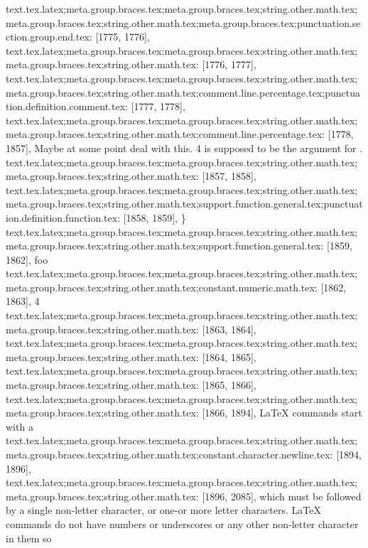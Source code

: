 {{{{{{{{{{{{{{{{{{{{{{{{{{{{{{{{{{{{{{{{{{{{{{{{{text.tex.latex;meta.group.braces.tex;meta.group.braces.tex;string.other.math.tex;meta.group.braces.tex;string.other.math.tex;meta.group.braces.tex;punctuation.section.group.end.tex: [1775, 1776], {}}
text.tex.latex;meta.group.braces.tex;meta.group.braces.tex;string.other.math.tex;meta.group.braces.tex;string.other.math.tex: [1776, 1777], {
}
text.tex.latex;meta.group.braces.tex;meta.group.braces.tex;string.other.math.tex;meta.group.braces.tex;string.other.math.tex;comment.line.percentage.tex;punctuation.definition.comment.tex: [1777, 1778], {%
text.tex.latex;meta.group.braces.tex;meta.group.braces.tex;string.other.math.tex;meta.group.braces.tex;string.other.math.tex;comment.line.percentage.tex: [1778, 1857], { Maybe at some point deal with this. 4 is supposed to be the argument for \foo.}
text.tex.latex;meta.group.braces.tex;meta.group.braces.tex;string.other.math.tex;meta.group.braces.tex;string.other.math.tex: [1857, 1858], {
}
text.tex.latex;meta.group.braces.tex;meta.group.braces.tex;string.other.math.tex;meta.group.braces.tex;string.other.math.tex;support.function.general.tex;punctuation.definition.function.tex: [1858, 1859], {\}
text.tex.latex;meta.group.braces.tex;meta.group.braces.tex;string.other.math.tex;meta.group.braces.tex;string.other.math.tex;support.function.general.tex: [1859, 1862], {foo}
text.tex.latex;meta.group.braces.tex;meta.group.braces.tex;string.other.math.tex;meta.group.braces.tex;string.other.math.tex;constant.numeric.math.tex: [1862, 1863], {4}
text.tex.latex;meta.group.braces.tex;meta.group.braces.tex;string.other.math.tex;meta.group.braces.tex;string.other.math.tex: [1863, 1864], {
}
text.tex.latex;meta.group.braces.tex;meta.group.braces.tex;string.other.math.tex;meta.group.braces.tex;string.other.math.tex: [1864, 1865], {
}
text.tex.latex;meta.group.braces.tex;meta.group.braces.tex;string.other.math.tex;meta.group.braces.tex;string.other.math.tex: [1865, 1866], {
}
text.tex.latex;meta.group.braces.tex;meta.group.braces.tex;string.other.math.tex;meta.group.braces.tex;string.other.math.tex: [1866, 1894], {LaTeX commands start with a }
text.tex.latex;meta.group.braces.tex;meta.group.braces.tex;string.other.math.tex;meta.group.braces.tex;string.other.math.tex;constant.character.newline.tex: [1894, 1896], {\\}
text.tex.latex;meta.group.braces.tex;meta.group.braces.tex;string.other.math.tex;meta.group.braces.tex;string.other.math.tex: [1896, 2085], { which must be followed by a single non-letter character, or one-or more letter characters.  LaTeX commands do not have numbers or underscores or any other non-letter character in them  so }
}}}}}}}}}}}}}}}}}}}}}}}}}}}}}}}}}}}}}}}}}}}}}}}}}}
